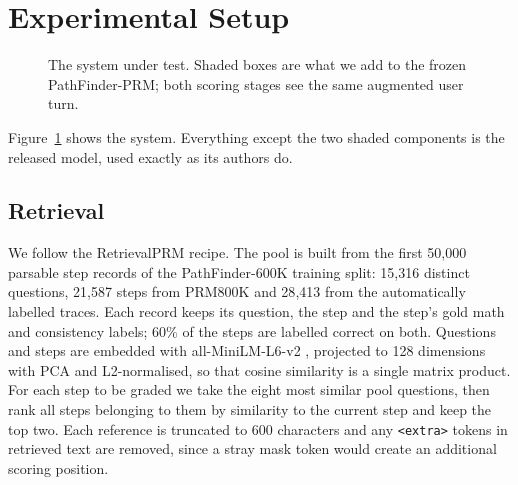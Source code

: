 \documentclass[11pt]{article}
\newcommand{\pos}{\texttt{<+>}}
\newcommand{\negt}{\texttt{<->}}
\newcommand{\extra}{\texttt{<extra>}}
\begin{document}
\section{Experimental Setup}
\label{sec:setup}

\begin{figure}[t]
\centering
{}
\caption{The system under test. Shaded boxes are what we add to the frozen PathFinder-PRM;
both scoring stages see the same augmented user turn.}
\label{fig:pipeline}
\end{figure}

Figure~\ref{fig:pipeline} shows the system. Everything except the two shaded components is
the released model, used exactly as its authors do.

\subsection{Retrieval}

We follow the RetrievalPRM recipe. The pool is built from the first 50{,}000 parsable step
records of the PathFinder-600K training split: 15{,}316 distinct questions, 21{,}587 steps
from PRM800K and 28{,}413 from the automatically labelled traces. Each record keeps its
question, the step and the step's gold math and consistency labels; 60\% of the steps are
labelled correct on both. Questions and steps are
embedded with all-MiniLM-L6-v2 \citep{wang2020minilm,reimers2019sbert}, projected to 128
dimensions with PCA and L2-normalised, so that cosine similarity is a single matrix product. For
each step to be graded we take the eight most similar pool questions, then rank all steps
belonging to them by similarity to the current step and keep the top two. Each reference is
truncated to 600 characters and any \extra{} tokens in retrieved text are removed, since a stray
mask token would create an additional scoring position.
\end{document}
